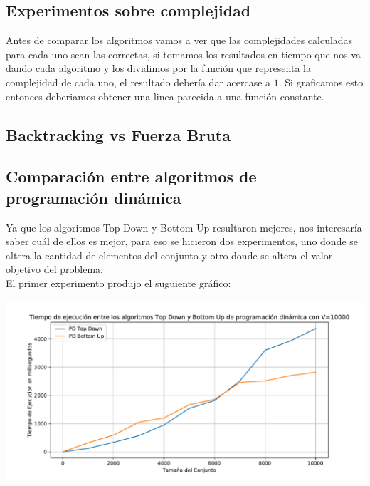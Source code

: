 \documentclass[a4paper]{article}
\begin{document}
%

\subsection{Experimentos sobre complejidad}
Antes de comparar los algoritmos vamos a ver que las complejidades calculadas para cada uno sean las correctas, si tomamos los resultados en tiempo que nos va dando cada algoritmo y los dividimos por la función que representa la complejidad de cada uno, el resultado debería dar acercase a $1$. Si graficamos esto entonces deberiamos obtener una linea parecida a una función constante.

\subsection{Backtracking vs Fuerza Bruta}

\subsection{Comparación entre algoritmos de programación dinámica}

Ya que los algoritmos Top Down y Bottom Up resultaron mejores, nos interesaría saber cuál de ellos es mejor, para eso se hicieron dos experimentos, uno donde se altera la cantidad de elementos del conjunto y otro donde se altera el valor objetivo del problema.
\\
El primer experimento produjo el suguiente gráfico:

\begin{center}
	\includegraphics[width=.8\linewidth]{G2.pdf}
\end{center}
\end{document}
